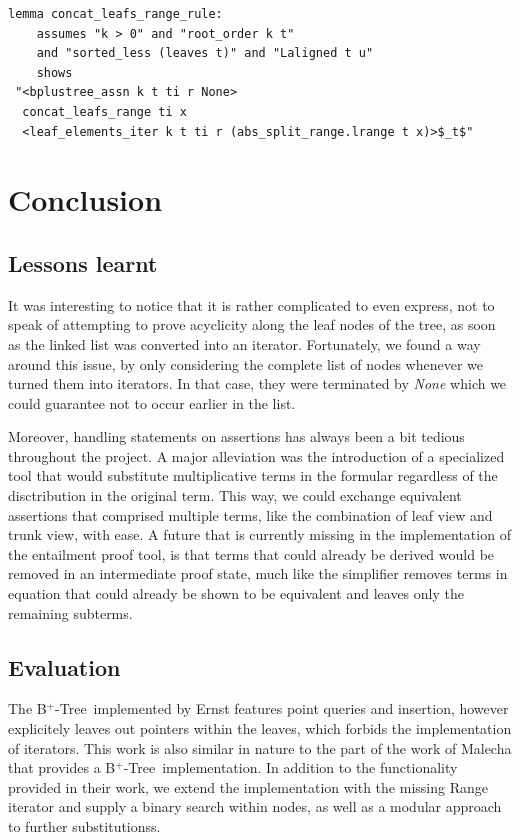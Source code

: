 \documentclass[a4paper,UKenglish,cleveref, autoref, thm-restate]{lipics-v2021}
\newcommand{\btree}{B$^+$-Tree}
\begin{document}
\begin{lstlisting}[mathescape=true, language=Isabelle,label=lst:btree-leafs-range]
lemma concat_leafs_range_rule:
    assumes "k > 0" and "root_order k t" 
    and "sorted_less (leaves t)" and "Laligned t u"
    shows 
 "<bplustree_assn k t ti r None>
  concat_leafs_range ti x
  <leaf_elements_iter k t ti r (abs_split_range.lrange t x)>$_t$"
\end{lstlisting}



\section{Conclusion}
\label{sec:conclusion}

\subsection{Lessons learnt}

It was interesting to notice that it is rather complicated
to even express, not to speak of attempting to prove acyclicity
 along the leaf nodes of the tree, as soon as the linked list was converted into an iterator.
Fortunately, we found a way around this issue, by only considering
the complete list of nodes whenever we turned them into
iterators. In that case, they were terminated by \textit{None}
which we could guarantee not to occur earlier in the list.

Moreover, handling statements on assertions has always been
a bit tedious throughout the project.
A major alleviation was the introduction of a specialized tool
that would substitute multiplicative terms in the formular
regardless of the disctribution in the original term.
This way, we could exchange equivalent assertions that comprised
multiple terms, like the combination of leaf view and trunk view,
with ease.
A future that is currently missing in the implementation of the entailment
proof tool, is that terms that could already be derived
would be removed in an intermediate proof state,
much like the simplifier removes terms in equation that could
already be shown to be equivalent and leaves only the remaining subterms.

\subsection{Evaluation}


The \btree\ implemented by Ernst features point queries and insertion,
however explicitely leaves out pointers within the leaves,
which forbids the implementation of iterators.
This work is also similar in nature to the part of the work of Malecha
that provides a \btree\ implementation.
In addition to the functionality provided in their work, we extend
the implementation with the missing Range iterator
and supply a binary search within nodes, as well as a modular approach
to further substitutionss.
\end{document}
